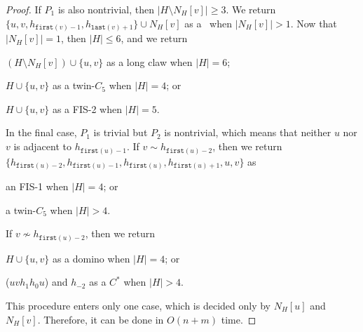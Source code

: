 \documentclass[10pt]{article}
\newcommand{\head}[1]{\ensuremath{{\mathtt{last}(#1)}}}
\newcommand{\tail}[1]{\ensuremath{{\mathtt{first}(#1)}}}
\begin{document}
\begin{proof}
  If $P_1$ is also nontrivial, then $|H\setminus N_H[v]|\ge 3$.  We
  return $\{u, v, h_{\tail{v}-1}, h_{\head{v}+1}\}\cup N_H[v]$ as a
  \dag\ when $|N_H[v]| > 1$.
  Now that $|N_H[v]|= 1$, then $|H|\le 6$, and we return
  \begin{inparaenum}[(\itshape 1\upshape)]
  \item $(H\setminus N_H[v])\cup \{u, v\}$ as a long claw when $|H|=
    6$;
  \item  $H\cup\{u,v\}$ as a twin-$C_5$ when $|H|= 4$; or
  \item $H\cup\{u,v\}$ as a FIS-2 when $|H|= 5$.
  \end{inparaenum}
  In the final case, $P_1$ is trivial but $P_2$ is nontrivial, which
  means that neither $u$ nor $v$ is adjacent to $h_{\tail{u}-1}$.  If
  $v\sim h_{\tail{u}-2}$, then we return $\{h_{\tail{u}-2},
  h_{\tail{u}-1}, h_{\tail{u}}, h_{\tail{u}+1}, u, v\}$ as
  \begin{inparaenum}[(\itshape 1\upshape)]
  \item an FIS-1 when $|H| = 4$; or
  \item a twin-$C_5$ when $|H| > 4$.
  \end{inparaenum}
  If $v\not\sim h_{\tail{u}-2}$, then we return
  \begin{inparaenum}[(\itshape 1\upshape)]
  \item $H\cup\{u,v\}$ as a domino when $|H| = 4$; or
  \item ($u v h_1 h_0 u$) and $h_{-2}$ as a $C^*$ when $|H| > 4$.
  \end{inparaenum}
  This procedure enters only one case, which is decided only by
  $N_H[u]$ and $N_H[v]$.  Therefore, it can be done in $O(n+m)$ time.
\end{proof}
\end{document}
